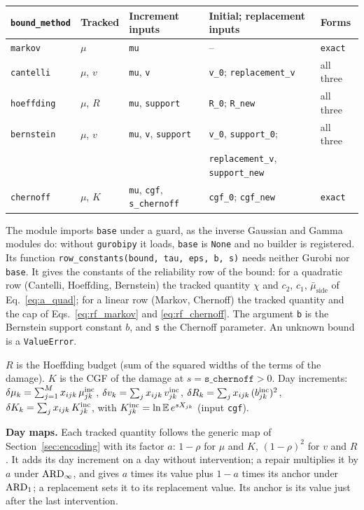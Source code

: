 \begingroup\small
\begin{longtable}{@{}lllll@{}}
\toprule
\texttt{bound\_method} & Tracked & Increment inputs & Initial; replacement inputs & Forms \\
\midrule
\texttt{markov} & $\mu$ & \texttt{mu} & -- & \texttt{exact} \\
\texttt{cantelli} & $\mu$, $v$ & \texttt{mu}, \texttt{v}
  & \texttt{v\_0}; \texttt{replacement\_v} & all three \\
\texttt{hoeffding} & $\mu$, $R$ & \texttt{mu}, \texttt{support}
  & \texttt{R\_0}; \texttt{R\_new} & all three \\
\texttt{bernstein} & $\mu$, $v$ & \texttt{mu}, \texttt{v}, \texttt{support}
  & \texttt{v\_0}, \texttt{support\_0}; & all three \\
 & & & \texttt{replacement\_v}, \texttt{support\_new} & \\
\texttt{chernoff} & $\mu$, $K$ & \texttt{mu}, \texttt{cgf}, \texttt{s\_chernoff}
  & \texttt{cgf\_0}; \texttt{cgf\_new} & \texttt{exact} \\
\bottomrule
\end{longtable}
\endgroup

The module imports \texttt{base} under a guard, as the inverse Gaussian and Gamma
modules do: without \texttt{gurobipy} it loads, \texttt{base} is \texttt{None} and no
builder is registered. Its function \texttt{row\_constants(bound, tau, eps, b, s)} needs
neither Gurobi nor \texttt{base}. It gives the constants of the reliability row of the
bound: for a quadratic row (Cantelli, Hoeffding, Bernstein) the tracked quantity
$\chi$ and $c_2$, $c_1$, $\bar\mu_{\mathrm{side}}$ of Eq.~\eqref{eq:a_quad}; for a linear
row (Markov, Chernoff) the tracked quantity and the cap of Eqs.~\eqref{eq:rf_markov} and
\eqref{eq:rf_chernoff}. The argument \texttt{b} is the Bernstein support constant $b$,
and \texttt{s} the Chernoff parameter. An unknown bound is a \texttt{ValueError}.

$R$ is the Hoeffding budget (sum of the squared widths of the terms of the damage).
$K$ is the CGF of the damage at $s = \texttt{s\_chernoff} > 0$. Day increments:
$\delta\mu_k = \sum_{j=1}^M x_{ijk}\,\mu^{\mathrm{inc}}_{jk}$,
$\delta v_k = \sum_{j} x_{ijk}\,v^{\mathrm{inc}}_{jk}$,
$\delta R_k = \sum_{j} x_{ijk}\,(b^{\mathrm{inc}}_{jk})^2$,
$\delta K_k = \sum_{j} x_{ijk}\,K^{\mathrm{inc}}_{jk}$, with
$K^{\mathrm{inc}}_{jk} = \ln\mathbb{E}\,e^{s X_{jk}}$ (input \texttt{cgf}).

\textbf{Day maps.} Each tracked quantity follows the generic map of
Section~\ref{sec:encoding} with its factor $a$: $1-\rho$ for $\mu$ and $K$,
$(1-\rho)^2$ for $v$ and $R$. It adds its day
increment on a day without intervention; a repair multiplies it by $a$ under
$\mathrm{ARD}_{\infty}$, and gives $a$ times its value plus $1-a$ times its anchor under
$\mathrm{ARD}_{1}$; a replacement sets it to its replacement value. Its anchor is its value
just after the last intervention.

